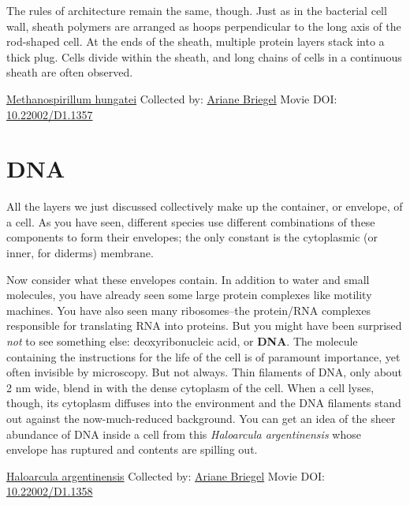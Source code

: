 \documentclass[]{tufte-book}
\begin{document}
The rules of architecture remain the same, though. Just as in the bacterial cell wall, sheath polymers are arranged as hoops perpendicular to the long axis of the rod-shaped cell. At the ends of the sheath, multiple protein layers stack into a thick plug. Cells divide within the sheath, and long chains of cells in a continuous sheath are often observed.



\hypertarget{htmlwidget-8259887baf007d069af1}{}

\label{fig:2-8}\protect\hyperlink{tree}{Methanospirillum hungatei} Collected by: \protect\hyperlink{ariane_briegel}{Ariane Briegel} Movie DOI: \href{https://doi.org/10.22002/D1.1357}{10.22002/D1.1357}

\hypertarget{dna}{%
\section{DNA}\label{dna}}

All the layers we just discussed collectively make up the container, or envelope, of a cell. As you have seen, different species use different combinations of these components to form their envelopes; the only constant is the cytoplasmic (or inner, for diderms) membrane.

Now consider what these envelopes contain. In addition to water and small molecules, you have already seen some large protein complexes like motility machines. You have also seen many ribosomes--the protein/RNA complexes responsible for translating RNA into proteins. But you might have been surprised \emph{not} to see something else: deoxyribonucleic acid, or \textbf{DNA}. The molecule containing the instructions for the life of the cell is of paramount importance, yet often invisible by microscopy. But not always. Thin filaments of DNA, only about 2 nm wide, blend in with the dense cytoplasm of the cell. When a cell lyses, though, its cytoplasm diffuses into the environment and the DNA filaments stand out against the now-much-reduced background. You can get an idea of the sheer abundance of DNA inside a cell from this \emph{Haloarcula argentinensis} whose envelope has ruptured and contents are spilling out.



\hypertarget{htmlwidget-3de0ff9e185bf8d641d1}{}

\label{fig:2-9}\protect\hyperlink{tree}{Haloarcula argentinensis} Collected by: \protect\hyperlink{ariane_briegel}{Ariane Briegel} Movie DOI: \href{https://doi.org/10.22002/D1.1358}{10.22002/D1.1358}
\end{document}
